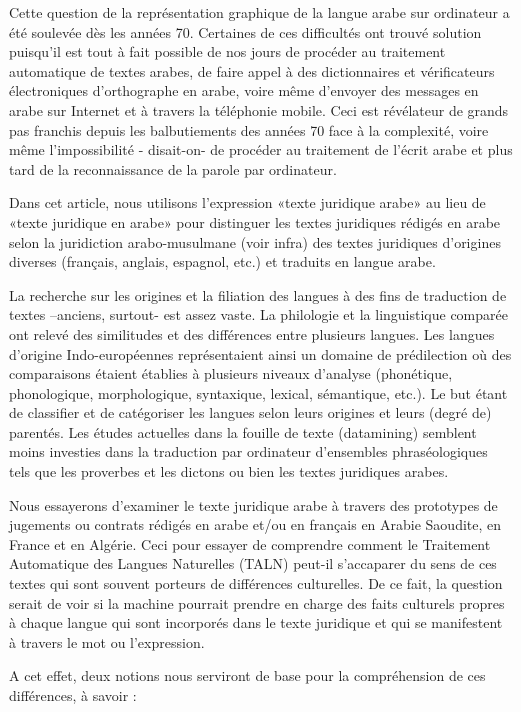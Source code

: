 \documentclass[french]{textolivre}
\begin{document}
Cette question de la représentation graphique de la langue arabe sur ordinateur a été soulevée dès les années 70. Certaines de ces difficultés ont trouvé solution puisqu’il est tout à fait possible de nos jours de procéder au traitement automatique de textes arabes, de faire appel à des dictionnaires et vérificateurs électroniques d’orthographe en arabe, voire même d’envoyer des messages en arabe sur Internet et à travers la téléphonie mobile. Ceci est révélateur de grands pas franchis depuis les balbutiements des années 70 face à la complexité, voire même l’impossibilité - disait-on- de procéder au traitement de l’écrit arabe et plus tard de la reconnaissance de la parole par ordinateur.

Dans cet article, nous utilisons l’expression «texte juridique arabe» au lieu de «texte juridique en arabe» pour distinguer les textes juridiques rédigés en arabe selon la juridiction arabo-musulmane (voir infra) des textes juridiques d’origines diverses (français, anglais, espagnol, etc.) et traduits en langue arabe.

La recherche sur les origines et la filiation des langues à des fins de traduction de textes –anciens, surtout- est assez vaste. La philologie et la linguistique comparée ont relevé des similitudes et des différences entre plusieurs langues. Les langues d’origine Indo-européennes représentaient ainsi un domaine de prédilection où des comparaisons étaient établies à plusieurs niveaux d’analyse (phonétique, phonologique, morphologique, syntaxique, lexical, sémantique, etc.). Le but étant de classifier et de catégoriser les langues selon leurs origines et leurs (degré de) parentés. Les études actuelles dans la fouille de texte (datamining) semblent moins investies dans la traduction par ordinateur d’ensembles phraséologiques tels que les proverbes et les dictons ou bien les textes juridiques arabes.

Nous essayerons d’examiner le texte juridique arabe à travers des prototypes de jugements ou contrats rédigés en arabe et/ou en français en Arabie Saoudite, en France et en Algérie. Ceci pour essayer de comprendre comment le Traitement Automatique des Langues Naturelles (TALN) peut-il s’accaparer du sens de ces textes qui sont souvent porteurs de différences culturelles. De ce fait, la question serait de voir si la machine pourrait prendre en charge des faits culturels propres à chaque langue qui sont incorporés dans le texte juridique et qui se manifestent à travers le mot ou l’expression.

A cet effet, deux notions nous serviront de base pour la compréhension de ces différences, à savoir :
\end{document}
